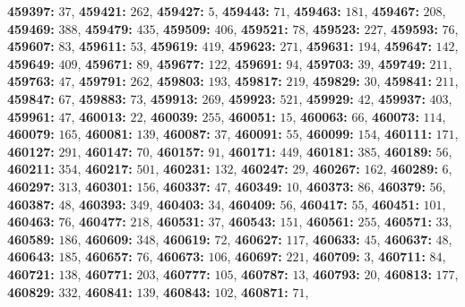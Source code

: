 \textsf{\bfseries 459397:} $37$, \textsf{\bfseries 459421:} $262$, \textsf{\bfseries 459427:} $5$, \textsf{\bfseries 459443:} $71$, \textsf{\bfseries 459463:} $181$, \textsf{\bfseries 459467:} $208$, \textsf{\bfseries 459469:} $388$, \textsf{\bfseries 459479:} $435$, \textsf{\bfseries 459509:} $406$, \textsf{\bfseries 459521:} $78$, \textsf{\bfseries 459523:} $227$, \textsf{\bfseries 459593:} $76$, \textsf{\bfseries 459607:} $83$, \textsf{\bfseries 459611:} $53$, \textsf{\bfseries 459619:} $419$, \textsf{\bfseries 459623:} $271$, \textsf{\bfseries 459631:} $194$, \textsf{\bfseries 459647:} $142$, \textsf{\bfseries 459649:} $409$, \textsf{\bfseries 459671:} $89$, \textsf{\bfseries 459677:} $122$, \textsf{\bfseries 459691:} $94$, \textsf{\bfseries 459703:} $39$, \textsf{\bfseries 459749:} $211$, \textsf{\bfseries 459763:} $47$, \textsf{\bfseries 459791:} $262$, \textsf{\bfseries 459803:} $193$, \textsf{\bfseries 459817:} $219$, \textsf{\bfseries 459829:} $30$, \textsf{\bfseries 459841:} $211$, \textsf{\bfseries 459847:} $67$, \textsf{\bfseries 459883:} $73$, \textsf{\bfseries 459913:} $269$, \textsf{\bfseries 459923:} $521$, \textsf{\bfseries 459929:} $42$, \textsf{\bfseries 459937:} $403$, \textsf{\bfseries 459961:} $47$, \textsf{\bfseries 460013:} $22$, \textsf{\bfseries 460039:} $255$, \textsf{\bfseries 460051:} $15$, \textsf{\bfseries 460063:} $66$, \textsf{\bfseries 460073:} $114$, \textsf{\bfseries 460079:} $165$, \textsf{\bfseries 460081:} $139$, \textsf{\bfseries 460087:} $37$, \textsf{\bfseries 460091:} $55$, \textsf{\bfseries 460099:} $154$, \textsf{\bfseries 460111:} $171$, \textsf{\bfseries 460127:} $291$, \textsf{\bfseries 460147:} $70$, \textsf{\bfseries 460157:} $91$, \textsf{\bfseries 460171:} $449$, \textsf{\bfseries 460181:} $385$, \textsf{\bfseries 460189:} $56$, \textsf{\bfseries 460211:} $354$, \textsf{\bfseries 460217:} $501$, \textsf{\bfseries 460231:} $132$, \textsf{\bfseries 460247:} $29$, \textsf{\bfseries 460267:} $162$, \textsf{\bfseries 460289:} $6$, \textsf{\bfseries 460297:} $313$, \textsf{\bfseries 460301:} $156$, \textsf{\bfseries 460337:} $47$, \textsf{\bfseries 460349:} $10$, \textsf{\bfseries 460373:} $86$, \textsf{\bfseries 460379:} $56$, \textsf{\bfseries 460387:} $48$, \textsf{\bfseries 460393:} $349$, \textsf{\bfseries 460403:} $34$, \textsf{\bfseries 460409:} $56$, \textsf{\bfseries 460417:} $55$, \textsf{\bfseries 460451:} $101$, \textsf{\bfseries 460463:} $76$, \textsf{\bfseries 460477:} $218$, \textsf{\bfseries 460531:} $37$, \textsf{\bfseries 460543:} $151$, \textsf{\bfseries 460561:} $255$, \textsf{\bfseries 460571:} $33$, \textsf{\bfseries 460589:} $186$, \textsf{\bfseries 460609:} $348$, \textsf{\bfseries 460619:} $72$, \textsf{\bfseries 460627:} $117$, \textsf{\bfseries 460633:} $45$, \textsf{\bfseries 460637:} $48$, \textsf{\bfseries 460643:} $185$, \textsf{\bfseries 460657:} $76$, \textsf{\bfseries 460673:} $106$, \textsf{\bfseries 460697:} $221$, \textsf{\bfseries 460709:} $3$, \textsf{\bfseries 460711:} $84$, \textsf{\bfseries 460721:} $138$, \textsf{\bfseries 460771:} $203$, \textsf{\bfseries 460777:} $105$, \textsf{\bfseries 460787:} $13$, \textsf{\bfseries 460793:} $20$, \textsf{\bfseries 460813:} $177$, \textsf{\bfseries 460829:} $332$, \textsf{\bfseries 460841:} $139$, \textsf{\bfseries 460843:} $102$, \textsf{\bfseries 460871:} $71$, 
